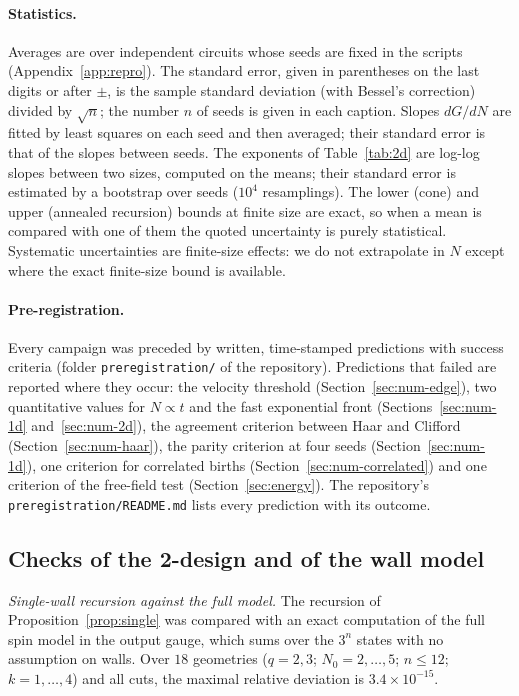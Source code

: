 \paragraph{Statistics.} Averages are over independent circuits whose seeds are fixed in the scripts (Appendix~\ref{app:repro}). The standard error, given in parentheses on the last digits or after $\pm$, is the sample standard deviation (with Bessel's correction) divided by $\sqrt n$; the number $n$ of seeds is given in each caption. Slopes $dG/dN$ are fitted by least squares on each seed and then averaged; their standard error is that of the slopes between seeds. The exponents of Table~\ref{tab:2d} are log-log slopes between two sizes, computed on the means; their standard error is estimated by a bootstrap over seeds ($10^4$ resamplings). The lower (cone) and upper (annealed recursion) bounds at finite size are exact, so when a mean is compared with one of them the quoted uncertainty is purely statistical. Systematic uncertainties are finite-size effects: we do not extrapolate in $N$ except where the exact finite-size bound is available.

\paragraph{Pre-registration.} Every campaign was preceded by written, time-stamped predictions with success criteria (folder \texttt{preregistration/} of the repository). Predictions that failed are reported where they occur: the velocity threshold (Section~\ref{sec:num-edge}), two quantitative values for $N\propto t$ and the fast exponential front (Sections~\ref{sec:num-1d} and~\ref{sec:num-2d}), the agreement criterion between Haar and Clifford (Section~\ref{sec:num-haar}), the parity criterion at four seeds (Section~\ref{sec:num-1d}), one criterion for correlated births (Section~\ref{sec:num-correlated}) and one criterion of the free-field test (Section~\ref{sec:energy}). The repository's \texttt{preregistration/README.md} lists every prediction with its outcome.

\subsection{Checks of the 2-design and of the wall model}\label{sec:num-checks}

\emph{Single-wall recursion against the full model.} The recursion of Proposition~\ref{prop:single} was compared with an exact computation of the full spin model in the output gauge, which sums over the $3^n$ states with no assumption on walls. Over $18$ geometries ($q=2,3$; $N_0=2,\dots,5$; $n\le12$; $k=1,\dots,4$) and all cuts, the maximal relative deviation is $3.4\times10^{-15}$.

